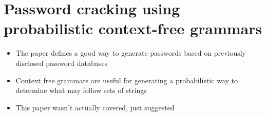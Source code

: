 \section{Password cracking using probabilistic context-free grammars}
\begin{itemize}
	\item The paper defines a good way to generate passwords based on previously disclosed password databases
	\item Context free grammars are useful for generating a probabilistic way to determine what may follow sets of strings
	\item This paper wasn't actually covered, just suggested
\end{itemize}